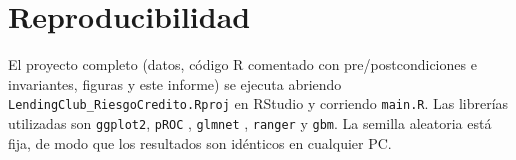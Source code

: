 \documentclass{article}
\begin{document}
\section*{Reproducibilidad}
El proyecto completo (datos, código R comentado con pre/postcondiciones e
invariantes, figuras y este informe) se ejecuta abriendo
\texttt{LendingClub\_RiesgoCredito.Rproj} en RStudio y corriendo
\texttt{main.R}. Las librerías utilizadas son \texttt{ggplot2}, \texttt{pROC}
\cite{robin2011}, \texttt{glmnet} \cite{friedman2010}, \texttt{ranger}
\cite{wright2017} y \texttt{gbm}. La semilla aleatoria está fija, de modo que
los resultados son idénticos en cualquier PC.



\end{document}
